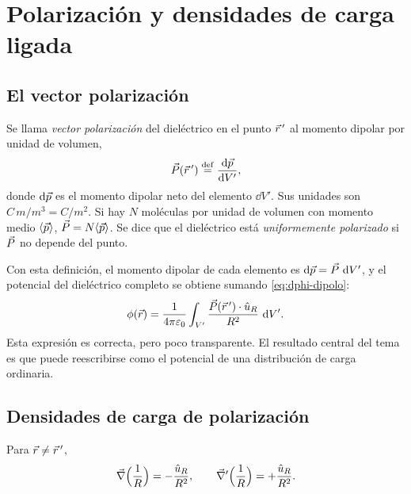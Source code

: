 \section{Polarización y densidades de carga ligada}\label{sec:polarizacion}

\subsection{El vector polarización}\label{sec:vector-P}

\begin{definicion}\label{def:polarizacion}
Se llama \emph{vector polarización} del dieléctrico en el punto $\vec r\,'$ al momento dipolar por unidad de
volumen,
\begin{equation}\label{eq:P}
  \vec P(\vec r\,')\mathrel{\overset{\mathrm{def}}{=}}\frac{\mathop{}\!\mathrm{d}\vec p}{\mathop{}\!\mathrm{d} V'} ,
\end{equation}
donde $\mathop{}\!\mathrm{d}\vec p$ es el momento dipolar neto del elemento $\dd V'$. Sus unidades son $\si{C\,m/m^3}=\si{C/m^2}$. Si hay
$N$ moléculas por unidad de volumen con momento medio $\langle\vec p\rangle$, $\vec P=N\langle\vec p\rangle$. Se dice que el
dieléctrico está \emph{uniformemente polarizado} si $\vec P$ no depende del punto.
\end{definicion}

Con esta definición, el momento dipolar de cada elemento es $\mathop{}\!\mathrm{d}\vec p=\vec P\,\mathop{}\!\mathrm{d} V'$, y el potencial del
dieléctrico completo se obtiene sumando \eqref{eq:dphi-dipolo}:
\begin{equation}\label{eq:phi-P}
  \phi(\vec r)=\frac{1}{4\pi\varepsilon_0}\int_{V'}\frac{\vec P(\vec r\,')\cdot\hat u_{R}}{R^2}\,\mathop{}\!\mathrm{d} V' .
\end{equation}
Esta expresión es correcta, pero poco transparente. El resultado central del tema es que puede
reescribirse como el potencial de una distribución de carga ordinaria.

\subsection{Densidades de carga de polarización}\label{sec:densidades}

\begin{lema}[Gradiente de $1/R$]\label{lem:grad-1R}
Para $\vec r\neq\vec r\,'$,
\begin{equation}\label{eq:grad-1R}
  \vec\nabla\Big(\frac1R\Big)=-\frac{\hat u_{R}}{R^2},\qquad
  \vec\nabla'\Big(\frac1R\Big)=+\frac{\hat u_{R}}{R^2}.
\end{equation}
\end{lema}

